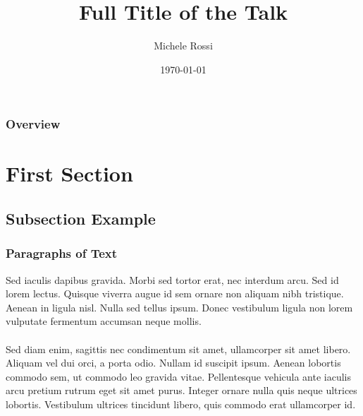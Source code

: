 \documentclass{beamer}
\title[Short title]{Full Title of the Talk} %
\institute[UNICAM] %
{
University of Camerino \\ %
}
\author{Michele Rossi} %
\date{\today} %
\begin{document}
\begin{frame}
\titlepage %
\end{frame}

\begin{frame}
\frametitle{Overview} %
\tableofcontents %
\end{frame}


\section{First Section} %

\subsection{Subsection Example} %

\begin{frame}
\frametitle{Paragraphs of Text}
Sed iaculis dapibus gravida. Morbi sed tortor erat, nec interdum arcu. Sed id lorem lectus. Quisque viverra augue id sem ornare non aliquam nibh tristique. Aenean in ligula nisl. Nulla sed tellus ipsum. Donec vestibulum ligula non lorem vulputate fermentum accumsan neque mollis.\\~\\

Sed diam enim, sagittis nec condimentum sit amet, ullamcorper sit amet libero. Aliquam vel dui orci, a porta odio. Nullam id suscipit ipsum. Aenean lobortis commodo sem, ut commodo leo gravida vitae. Pellentesque vehicula ante iaculis arcu pretium rutrum eget sit amet purus. Integer ornare nulla quis neque ultrices lobortis. Vestibulum ultrices tincidunt libero, quis commodo erat ullamcorper id.
\end{frame}
\end{document}
